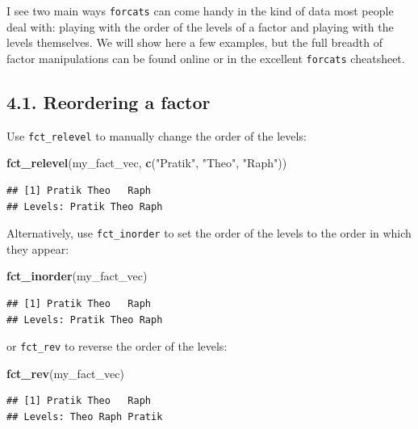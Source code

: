 \documentclass[]{book}
\newenvironment{Shaded}{}{}
\newcommand{\KeywordTok}[1]{\textcolor[rgb]{0.00,0.44,0.13}{\textbf{#1}}}
\newcommand{\NormalTok}[1]{#1}
\newcommand{\StringTok}[1]{\textcolor[rgb]{0.25,0.44,0.63}{#1}}
\begin{document}
I see two main ways \texttt{forcats} can come handy in the kind of data most people deal with: playing with the order of the levels of a factor and playing with the levels themselves. We will show here a few examples, but the full breadth of factor manipulations can be found online or in the excellent \texttt{forcats} cheatsheet.

\hypertarget{reordering-a-factor}{%
\subsection{4.1. Reordering a factor}\label{reordering-a-factor}}

Use \texttt{fct\_relevel} to manually change the order of the levels:

\begin{Shaded}
\begin{Highlighting}[]
\KeywordTok{fct_relevel}\NormalTok{(my_fact_vec, }\KeywordTok{c}\NormalTok{(}\StringTok{"Pratik"}\NormalTok{, }\StringTok{"Theo"}\NormalTok{, }\StringTok{"Raph"}\NormalTok{))}
\end{Highlighting}
\end{Shaded}

\begin{verbatim}
## [1] Pratik Theo   Raph  
## Levels: Pratik Theo Raph
\end{verbatim}

Alternatively, use \texttt{fct\_inorder} to set the order of the levels to the order in which they appear:

\begin{Shaded}
\begin{Highlighting}[]
\KeywordTok{fct_inorder}\NormalTok{(my_fact_vec)}
\end{Highlighting}
\end{Shaded}

\begin{verbatim}
## [1] Pratik Theo   Raph  
## Levels: Pratik Theo Raph
\end{verbatim}

or \texttt{fct\_rev} to reverse the order of the levels:

\begin{Shaded}
\begin{Highlighting}[]
\KeywordTok{fct_rev}\NormalTok{(my_fact_vec)}
\end{Highlighting}
\end{Shaded}

\begin{verbatim}
## [1] Pratik Theo   Raph  
## Levels: Theo Raph Pratik
\end{verbatim}
\end{document}
